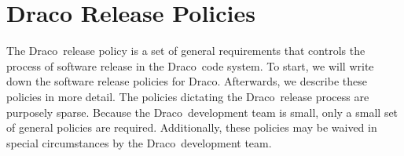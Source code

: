 \documentclass[11pt]{nmemo}
\newcommand{\draco}{{\normalfont\normalsize\sffamily Draco}}
\begin{document}
 
\section{Draco Release Policies}
\label{sec:policy}

The \draco\ release policy is a set of general requirements that
controls the process of software release in the \draco\ code system.
To start, we will write down the software release policies for \draco.
Afterwards, we describe these policies in more detail.  The policies
dictating the \draco\ release process are purposely sparse.  Because
the \draco\ development team is small, only a small set of general
policies are required.  Additionally, these policies may be waived in
special circumstances by the \draco\ development team.
\end{document}
